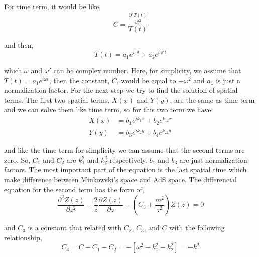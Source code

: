 For time term, it would be like,\\

\begin{equation}
    C = \frac{\frac{\partial^2 T(t)}{\partial t^2}}{T(t)}
\end{equation}

and then,\\

\begin{equation}
    T(t) = a_1 e^{i\omega t} + a_2 e^{i\omega't}
\end{equation}

which $\omega$ and $\omega'$ can be complex number. Here, for simplicity, we assume that $T(t) = a_1 e^{i\omega t}$, then the constant, $C$, would be equal to $-\omega^2$ and $a_1$ is just a normalization factor. For the next step we try to find the solution of spatial terms. The first two spatial terms, $X(x)$ and $Y(y)$, are the same as time term and we can solve them like time term, so for this two term we have:\\

\begin{align} \label{eq:AdSCartesianScalarFieldSolution}
    X(x) &= b_1 e^{ik_{1} x} + b_2 e^{k_{12} x}  \\
    Y(y) &= b_3 e^{ik_{2} y} + b_4 e^{k_{22} y}  \nonumber
\end{align}

and like the time term for simplicity we can assume that the second terms are zero. So, $C_1$ and $C_2$ are $k_1^2$ and $k_2^2$ respectively. $b_1$ and $b_3$ are just normalization factors. The most important part of the equation is the last spatial time which make difference between Minkowski's space and AdS space. The differencial equation for the second term has the form of,\\

\begin{equation} \label{eq:3thtermAdSI}
    \frac{\partial^2Z(z)}{\partial z^2} - \frac{2}{z}\frac{\partial Z(z)}{\partial z} - (C_3 + \frac{m^2}{z^2})Z(z) = 0 
\end{equation}

and $C_3$ is a constant that related with $C_2$, $C_3$, and $C$ with the following relationship,\\

\begin{equation}
    C_3 = C - C_1 - C_2 = -[\omega^2 - k_1^2 - k_2^2] = - k^2
\end{equation}


